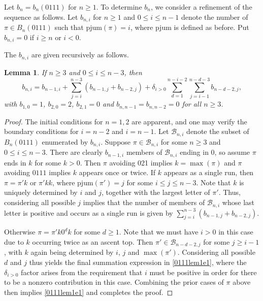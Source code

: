 \documentclass{article}
\theoremstyle{remark}
\theoremstyle{plain}
\newtheorem{lemma}[theorem]{Lemma}
\begin{document}
Let $b_n=b_n(0111)$ for $n \geq1$.  To determine $b_n$, we consider a refinement of the sequence as follows.  Let $b_{n,i}$ for $n \geq 1$ and $0 \leq i \leq n-1$ denote the number of $\pi \in B_n(0111)$ such that $\text{pjum}(\pi)=i$, where pjum is defined as before.  Put $b_{n,i}=0$ if $i \geq n$ or $i<0$.

The $b_{n,i}$ are given recursively as follows.

\begin{lemma}\label{0111lem1}
If $n \geq 3$ and $0 \leq i \leq n-3$, then
\begin{equation}\label{0111lem1e1}
b_{n,i}=b_{n-1,i}+\sum_{j=i}^{n-3}(b_{n-1,j}+b_{n-2,j})+\delta_{i>0}\sum_{d=1}^{n-i-2}\sum_{j=i-1}^{n-d-3}b_{n-d-2,j},
\end{equation}
with $b_{1,0}=1$, $b_{2,0}=2$, $b_{2,1}=0$ and $b_{n,n-1}=b_{n,n-2}=0$ for all $n \geq 3$.
\end{lemma}
\begin{proof}
The initial conditions for $n=1,2$ are apparent, and one may verify the boundary conditions for $i=n-2$ and $i=n-1$.  Let $\mathcal{B}_{n,i}$ denote the subset of $B_n(0111)$ enumerated by $b_{n,i}$.  Suppose $\pi \in \mathcal{B}_{n,i}$ for some $n \geq 3$ and $0 \leq i \leq n-3$.  There are clearly $b_{n-1,i}$ members of $\mathcal{B}_{n,i}$ ending in 0, so assume $\pi$ ends in $k$ for some $k>0$.  Then $\pi$ avoiding 021 implies $k=\max(\pi)$ and $\pi$ avoiding $0111$ implies $k$ appears once or twice.  If $k$ appears as a single run, then $\pi=\pi'k$ or $\pi'kk$, where $\text{pjum}(\pi')=j$ for some $i \leq j \leq n-3$.
Note that $k$ is uniquely determined by $i$ and $j$, together with the largest letter of $\pi'$. Thus, considering all possible $j$ implies that the number of members of $\mathcal{B}_{n,i}$ whose last letter is positive and occurs as a single run is given by $\sum_{j=i}^{n-3}(b_{n-1,j}+b_{n-2,j})$.

Otherwise $\pi=\pi'k0^dk$ for some $d \geq 1$.  Note that we must have $i>0$ in this case due to $k$ occurring twice as an ascent top. Then $\pi' \in \mathcal{B}_{n-d-2,j}$ for some $j \geq i-1$, with $k$ again being determined by $i$, $j$ and $\max(\pi')$.  Considering all possible $d$ and $j$ thus yields the final summation expression in \eqref{0111lem1e1}, where the $\delta_{i>0}$ factor arises from the requirement that $i$ must be positive in order for there to be a nonzero contribution in this case.  Combining the prior cases of $\pi$ above then implies \eqref{0111lem1e1} and completes the proof.
\end{proof}
\end{document}

